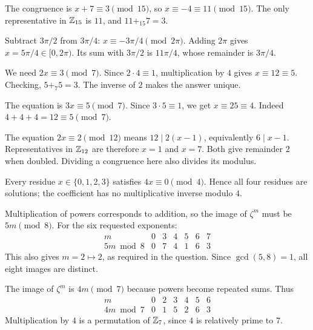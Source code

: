 
The congruence is $x+7\equiv3\pmod{15}$, so $x\equiv-4\equiv11\pmod{15}$. The only representative in $\mathbb{Z}_{15}$ is $11$, and $11+_{15}7=3$.


Subtract $3\pi/2$ from $3\pi/4$: $x\equiv-3\pi/4\pmod{2\pi}$. Adding $2\pi$ gives $x=5\pi/4\in[0,2\pi)$. Its sum with $3\pi/2$ is $11\pi/4$, whose remainder is $3\pi/4$.


We need $2x\equiv3\pmod7$. Since $2\cdot4\equiv1$, multiplication by $4$ gives $x\equiv12\equiv5$. Checking, $5+_7 5=3$. The inverse of $2$ makes the answer unique.


The equation is $3x\equiv5\pmod7$. Since $3\cdot5\equiv1$, we get $x\equiv25\equiv4$. Indeed $4+4+4=12\equiv5\pmod7$.


The equation $2x\equiv2\pmod{12}$ means $12\mid2(x-1)$, equivalently $6\mid x-1$. Representatives in $\mathbb{Z}_{12}$ are therefore $x=1$ and $x=7$. Both give remainder $2$ when doubled. Dividing a congruence here also divides its modulus.


Every residue $x\in\{0,1,2,3\}$ satisfies $4x\equiv0\pmod4$. Hence all four residues are solutions; the coefficient has no multiplicative inverse modulo $4$.


Multiplication of powers corresponds to addition, so the image of $\zeta^m$ must be $5m\pmod8$. For the six requested exponents:
\[\begin{array}{c|rrrrrr}m&0&3&4&5&6&7\\\hline 5m\bmod8&0&7&4&1&6&3\end{array}\]
This also gives $m=2\mapsto2$, as required in the question. Since $\gcd(5,8)=1$, all eight images are distinct.


The image of $\zeta^m$ is $4m\pmod7$ because powers become repeated sums. Thus
\[\begin{array}{c|rrrrrr}m&0&2&3&4&5&6\\\hline4m\bmod7&0&1&5&2&6&3\end{array}\]
Multiplication by $4$ is a permutation of $\mathbb{Z}_7$, since $4$ is relatively prime to $7$.

